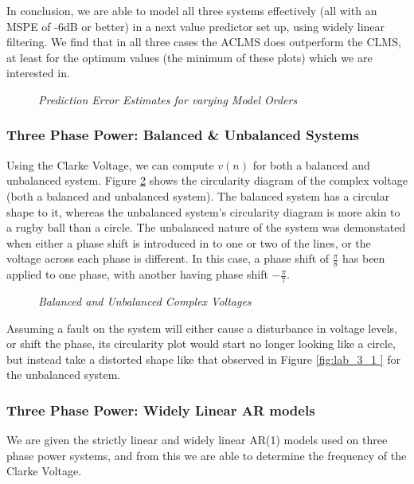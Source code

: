 \documentclass[./main.tex]{subfiles}
\begin{document}
In conclusion, we are able to model all three systems effectively (all with an MSPE of -6dB or better) in a next value predictor set up, using widely linear filtering. We find that in all three cases the ACLMS does outperform the CLMS, at least for the optimum values (the minimum of these plots) which we are interested in.

\begin{figure}[h]
	\centering
	\resizebox{\textwidth}{!}{}
	\caption{\textit{Prediction Error Estimates for varying Model Orders}}
	\label{fig:4_1_b_order}
\end{figure}

\subsubsection{Three Phase Power: Balanced \& Unbalanced Systems} \label{sec:4_1_c}

Using the Clarke Voltage, we can compute $v(n)$ for both a balanced and unbalanced system. Figure \ref{fig:4_1_c} shows the circularity diagram of the complex voltage (both a balanced and unbalanced system). The balanced system has a circular shape to it, whereas the unbalanced system's circularity diagram is more akin to a rugby ball than a circle. The unbalanced nature of the system was demonstated when either a phase shift is introduced in to one or two of the lines, or the voltage across each phase is different. In this case, a phase shift of $\frac{\pi}{8}$ has been applied to one phase, with another having phase shift $-\frac{\pi}{7}$.

\begin{figure}[h]
	\centering
	\resizebox{0.45\textwidth}{!}{}
	\caption{\textit{Balanced and Unbalanced Complex Voltages}}
	\label{fig:4_1_c}
\end{figure}

Assuming a fault on the system will either cause a disturbance in voltage levels, or shift the phase, its circularity plot would start no longer looking like a circle, but instead take a distorted shape like that observed in Figure \ref{fig:lab_3_1 } for the unbalanced system.


\subsubsection{Three Phase Power: Widely Linear AR models} \label{sec:4_1_d}
We are given the strictly linear and widely linear AR(1) models used on three phase power systems, and from this we are able to determine the frequency of the Clarke Voltage.
\end{document}
